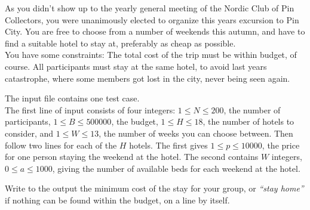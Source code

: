 
\begin{problem}
As you didn’t show up to the yearly general meeting of the Nordic Club of Pin Collectors, you were unanimously elected to organize this years excursion to Pin City. 
You are free to choose from a number of weekends this autumn, and have to find a suitable hotel to stay at, preferably as cheap as possible. \\
You have some constraints: The total cost of the trip must be within budget, of course. All participants must stay at the same hotel, to avoid last years catastrophe, where some members got lost in the city, never being seen again.
\end{problem}

\begin{inputdescription}
The input file contains one test case.\\
The first line of input consists of four integers: $1 \le N \le 200$, the number of participants,  $1 \le B \le 500000$, the budget, $1 \le H \le 18$, the number of hotels to consider, and $1 \le W \le 13$, the number of weeks you can choose between. Then follow two lines for each of the $H$ hotels. The first gives $1 \le p \le 10000$, the price for one person staying the weekend at the hotel. The second contains $W$ integers, $0 \le a \le 1000$, giving the number of available beds for each weekend at the hotel.
\end{inputdescription}

\begin{outputdescription}
Write to the output the minimum cost of the stay for your group, or \emph{``stay home''} if nothing can be found within the budget, on a line by itself.
\end{outputdescription}

\def\samples{
  \sample{testcases/sample1}
  \sample{testcases/sample2}
}

